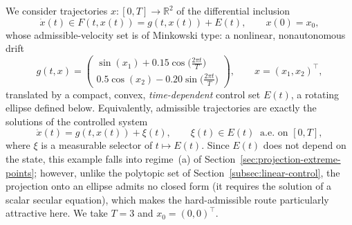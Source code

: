 \documentclass[11pt]{elsarticle}
\theoremstyle{definition}
\theoremstyle{remark}
\numberwithin{equation}{section}
\begin{document}
We consider trajectories $x:[0,T]\to\mathbb{R}^2$ of the differential
inclusion
\begin{equation}
	\label{eq:ellipse-inclusion}
	\dot{x}(t)\in F(t,x(t)) = g(t,x(t))+E(t),
	\qquad x(0)=x_0,
\end{equation}
whose admissible-velocity set is of Minkowski type: a nonlinear,
nonautonomous drift
\begin{equation}
	\label{eq:ellipse-drift}
	g(t,x)=
	\begin{pmatrix}
		\sin(x_1)+0.15\cos\bigl(\tfrac{2\pi t}{T}\bigr)\\[2mm]
		0.5\cos(x_2)-0.20\sin\bigl(\tfrac{2\pi t}{T}\bigr)
	\end{pmatrix},
	\qquad x=(x_1,x_2)^{\top},
\end{equation}
translated by a compact, convex, \emph{time-dependent} control set
$E(t)$, a rotating ellipse defined below. Equivalently, admissible
trajectories are exactly the solutions of the controlled system
\begin{equation}
	\label{eq:ellipse-controlled}
	\dot{x}(t)=g(t,x(t))+\xi(t),
	\qquad \xi(t)\in E(t)\ \text{ a.e.\ on } [0,T],
\end{equation}
where $\xi$ is a measurable selector of $t\mapsto E(t)$. Since
$E(t)$ does not depend on the state, this example falls into
regime~(a) of Section~\ref{sec:projection-extreme-points}; however,
unlike the polytopic set of Section~\ref{subsec:linear-control}, the
projection onto an ellipse admits no closed form (it requires the
solution of a scalar secular equation), which makes the hard-admissible
route particularly attractive here. We take $T=3$ and $x_0=(0,0)^{\top}$.
\end{document}
